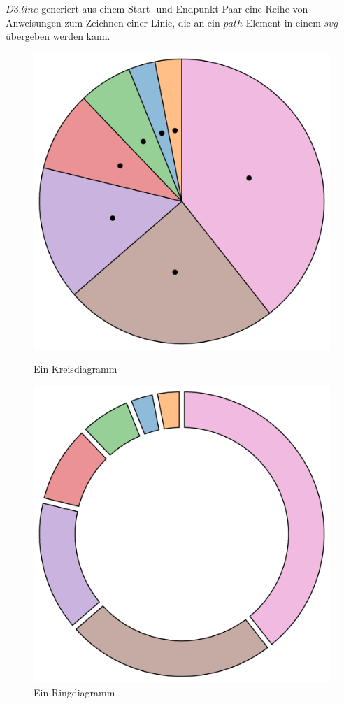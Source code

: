 $D3.line$ generiert aus einem Start- und Endpunkt-Paar eine Reihe von Anweisungen zum Zeichnen einer Linie, die an ein $path$-Element in einem $svg$ übergeben werden kann. 
\begin{figure}
	\centering
	\begin{minipage}{.5\textwidth}
	\centering
	\includegraphics[width=.8\linewidth]{../screenshots/kreisdiagramm.PNG}
	\caption{Ein Kreisdiagramm}
	\label{abb:kreisdiagramm}
	\end{minipage}%
	\begin{minipage}{.5\textwidth}
	\centering
	\includegraphics[width=.8\linewidth]{../screenshots/donutchart.PNG}
	\caption{Ein Ringdiagramm}
	\label{abb:donut}
	\end{minipage}
\end{figure}
